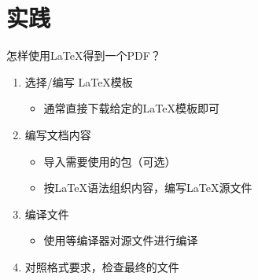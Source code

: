 
\section{实践}

\begin{frame}[fragile]{怎样使用\LaTeX{}得到一个PDF？}
	\begin{enumerate}
		\item 选择/编写 \LaTeX{}模板
		      \begin{itemize}
			      \item 通常直接下载给定的\LaTeX{}模板即可
		      \end{itemize}
		\item 编写文档内容
		      \begin{itemize}
			      \item 导入需要使用的包（可选）
			      \item 按\LaTeX{}语法组织内容，编写\LaTeX{}源文件
		      \end{itemize}
		\item 编译文件
		      \begin{itemize}
			      \item 使用\XeLaTeX{}等编译器对源文件进行编译
		      \end{itemize}
	    \item \alert{对照格式要求，检查最终的文件}
	\end{enumerate}
\end{frame}




